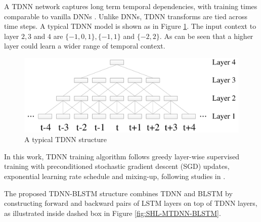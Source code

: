 \documentclass[a4paper]{article}
\begin{document}
A TDNN network captures long term temporal dependencies, with training times comparable to vanilla DNNs \cite{peddinti2015time}.
Unlike DNNs, TDNN transforms are tied across time steps. A typical TDNN model is shown as in Figure \ref{fig:tdnn}. The input context to layer $2,3$ and $4$ are $\{-1,0,1\}, \{-1,1\}$ and $\{-2,2\}$. As can be seen that a higher layer could learn a wider range of temporal context.
\begin{figure}[tbp]
\centering
\includegraphics[width = 0.9 \linewidth]{tdnn_emb.pdf}
\caption{A typical TDNN structure}
\label{fig:tdnn}
\end{figure}
In this work, TDNN training algorithm follows greedy layer-wise supervised training with
preconditioned stochastic gradient descent (SGD) updates, exponential learning rate schedule and mixing-up, following studies in  \cite{zhang2014improving}.

The proposed TDNN-BLSTM structure combines TDNN and BLSTM by constructing forward and backward pairs of LSTM layers on top of TDNN layers, as illustrated inside dashed box in Figure \ref{fig:SHL-MTDNN-BLSTM}.
\end{document}
